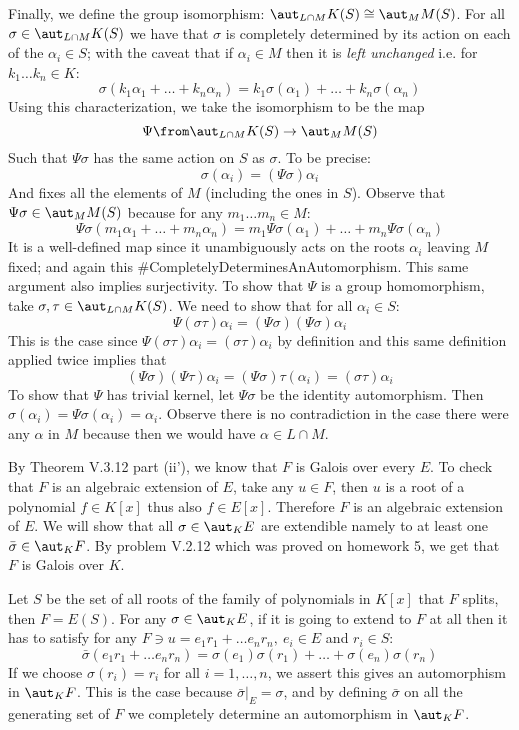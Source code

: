 Finally, we define the group isomorphism: $\aut_{L\cap M} K(S) \cong \aut_MM(S)$. 
For all $\sigma \in \aut_{L\cap M} K(S)$ we have that $\sigma$ is completely determined by its action on each of the $\alpha_i \in S$; with the caveat that if $\alpha_i \in M$ then it is \emph{left unchanged} i.e. for $k_1\ldots k_n \in K$:
$$\sigma(k_1 \alpha_1+\ldots + k_n \alpha_n) = k_1 \sigma(\alpha_1)+\ldots +  k_n \sigma(\alpha_n)$$
Using this characterization, we take the isomorphism to be the map 
$$\Psi \from \aut_{L\cap M} K(S) \to \aut_MM(S)$$
Such that  $\Psi\sigma$ has the same action on $S$ as $\sigma$. To be precise:
$$\sigma(\alpha_i)=(\Psi\sigma)\alpha_i$$
And fixes all the elements of $M$ (including the ones in $S$). Observe that $\Psi\sigma\in \aut_MM(S)$ because for any $m_1\ldots m_n \in M$:
$$\Psi\sigma(m_1 \alpha_1+\ldots + m_n \alpha_n) = m_1 \Psi\sigma(\alpha_1)+\ldots +  m_n \Psi\sigma(\alpha_n)$$
It is a well-defined map since it unambiguously acts on the roots $\alpha_i$ leaving $M$ fixed; and again this \#CompletelyDeterminesAnAutomorphism.
This same argument also implies surjectivity.
To show that $\Psi$ is a group homomorphism, take $\sigma, \tau\in   \aut_{L\cap M} K(S)$. We need to show that for all $\alpha_i \in S$:
$$\Psi(\sigma \tau)\alpha_i= (\Psi\sigma)(\Psi\sigma)\alpha_i$$   
This is the case since $\Psi(\sigma \tau)\alpha_i =(\sigma\tau)\alpha_i$ by definition and this same definition applied twice implies that 
$$(\Psi\sigma)(\Psi\tau)\alpha_i=(\Psi\sigma)\tau (\alpha_i)=(\sigma\tau)\alpha_i$$
To show that $\Psi$ has trivial kernel, let $\Psi\sigma$ be the identity automorphism. 
Then $\sigma(\alpha_i)=\Psi\sigma(\alpha_i) = \alpha_i$. 
Observe there is no contradiction in the case there were any $\alpha$ in $M$ because then we would have $\alpha\in L\cap M$.


By Theorem V.3.12 part (ii'), we know that $F$ is Galois over every $E$. To check that $F$ is an algebraic extension of $E$, take any $u\in F$, then $u$ is a root of a polynomial  $f\in K[x]$ thus also  $f\in E[x]$. Therefore $F$ is an algebraic extension of $E$.
We will show that all $\sigma\in \aut_KE$ are extendible namely to at least one $\bar\sigma \in \aut_K F$. By problem V.2.12 which was proved on homework 5, we get that $F$ is Galois over $K$.

Let $S$ be the set of all roots of the family of polynomials in $K[x]$ that $F$ splits, then $F=E(S)$. 
For any $\sigma\in \aut_KE$, if it is going to extend to $F$ at all then it has to satisfy for any $F\ni u=e_1 r_1 + \ldots e_n r_n,\ e_i\in E$ and $r_i\in S$:
$$\bar \sigma(e_1 r_1 + \ldots e_n r_n)=\sigma(e_1) \sigma(r_1) + \ldots +\sigma(e_n) \sigma(r_n)$$
If we choose $\sigma(r_i)=r_i$ for all $i=1,\ldots,n$, we assert this gives an automorphism in $\aut_KF$. 
This is the case because $\bar\sigma|_E=\sigma$, and by defining $\bar \sigma$ on all the generating set of $F$ we completely determine an automorphism in $\aut_K F$.

